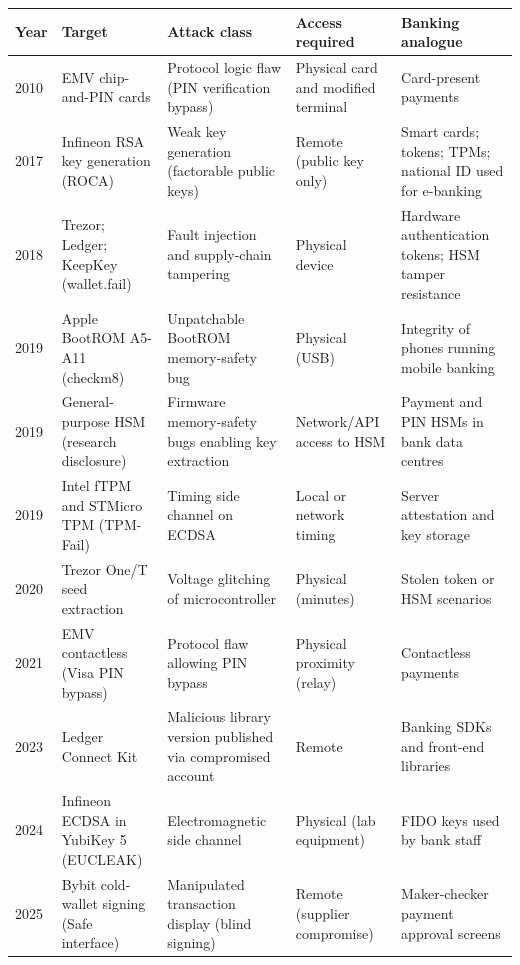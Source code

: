 \begin{tabular}{p{}p{}p{}p{}p{}}
\toprule
Year & Target & Attack class & Access required & Banking analogue \\
\midrule
2010 & EMV chip-and-PIN cards & Protocol logic flaw (PIN verification bypass) & Physical card and modified terminal & Card-present payments \\
2017 & Infineon RSA key generation (ROCA) & Weak key generation (factorable public keys) & Remote (public key only) & Smart cards; tokens; TPMs; national ID used for e-banking \\
2018 & Trezor; Ledger; KeepKey (wallet.fail) & Fault injection and supply-chain tampering & Physical device & Hardware authentication tokens; HSM tamper resistance \\
2019 & Apple BootROM A5-A11 (checkm8) & Unpatchable BootROM memory-safety bug & Physical (USB) & Integrity of phones running mobile banking \\
2019 & General-purpose HSM (research disclosure) & Firmware memory-safety bugs enabling key extraction & Network/API access to HSM & Payment and PIN HSMs in bank data centres \\
2019 & Intel fTPM and STMicro TPM (TPM-Fail) & Timing side channel on ECDSA & Local or network timing & Server attestation and key storage \\
2020 & Trezor One/T seed extraction & Voltage glitching of microcontroller & Physical (minutes) & Stolen token or HSM scenarios \\
2021 & EMV contactless (Visa PIN bypass) & Protocol flaw allowing PIN bypass & Physical proximity (relay) & Contactless payments \\
2023 & Ledger Connect Kit & Malicious library version published via compromised account & Remote & Banking SDKs and front-end libraries \\
2024 & Infineon ECDSA in YubiKey 5 (EUCLEAK) & Electromagnetic side channel & Physical (lab equipment) & FIDO keys used by bank staff \\
2025 & Bybit cold-wallet signing (Safe interface) & Manipulated transaction display (blind signing) & Remote (supplier compromise) & Maker-checker payment approval screens \\
\bottomrule
\end{tabular}